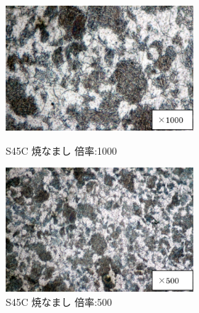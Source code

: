 \documentclass[10pt,a4j]{jsarticle}
\begin{document}
  \begin{figure}[htbp]
    \begin{minipage}{0.5\hsize}
      \begin{center}
        \includegraphics[width=7cm]{../img/S45C_yakinamashi_1000.png}
        \caption{S45C 焼なまし 倍率:1000}
      \end{center}
    \end{minipage}
    \begin{minipage}{0.5\hsize}
      \begin{center}
        \includegraphics[width=7cm]{../img/S45C_yakinamashi_500.png}
        \caption{S45C 焼なまし 倍率:500}
      \end{center}
    \end{minipage}
  \end{figure}
\end{document}
